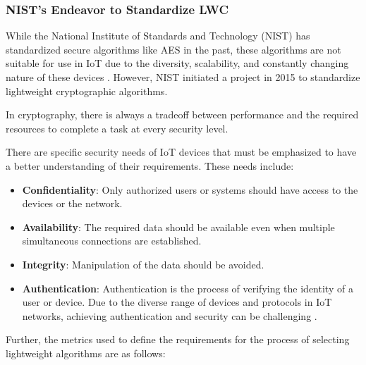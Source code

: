 \documentclass[a4paper,11pt, twoside]{article}
\begin{document}
\subsubsection{NIST's Endeavor to Standardize LWC}
While the National Institute of Standards and Technology (NIST) has standardized secure algorithms like AES in the past, these algorithms are not suitable for use in IoT due to the diversity, scalability, and constantly changing nature of these devices \cite{ekwueme2024lightweight}. However, NIST initiated a project in 2015 to standardize lightweight cryptographic algorithms.

In cryptography, there is always a tradeoff between performance and the required resources to complete a task at every security level.

There are specific security needs of IoT devices that must be emphasized to have a better understanding of their requirements. These needs include:

\begin{itemize}
    \setlength{\itemsep}{-5pt}
    \item \textbf{Confidentiality}: Only authorized users or systems should have access to the devices or the network.
    \item \textbf{Availability}: The required data should be available even when multiple simultaneous connections are established.
    \item \textbf{Integrity}: Manipulation of the data should be avoided.
    \item \textbf{Authentication}: Authentication is the process of verifying the identity of a user or device. Due to the diverse range of devices and protocols in IoT networks, achieving authentication and security can be challenging \cite{dutta2019lightweight} \cite{dhanda2020lightweight}.
\end{itemize}

Further, the metrics used to define the requirements for the process of selecting lightweight algorithms are as follows:
\end{document}
